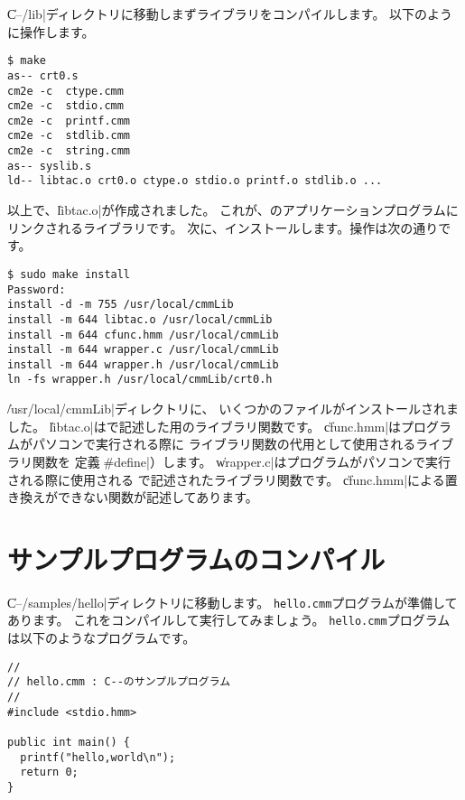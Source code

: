 \|C--/lib|ディレクトリに移動しまずライブラリをコンパイルします。
以下のように操作します。

\begin{mylist}
\begin{verbatim}
$ make
as-- crt0.s
cm2e -c  ctype.cmm
cm2e -c  stdio.cmm
cm2e -c  printf.cmm
cm2e -c  stdlib.cmm
cm2e -c  string.cmm
as-- syslib.s
ld-- libtac.o crt0.o ctype.o stdio.o printf.o stdlib.o ...
\end{verbatim}
\end{mylist}

以上で、\|libtac.o|が作成されました。
これが、{\tacos}のアプリケーションプログラムにリンクされるライブラリです。
次に、インストールします。操作は次の通りです。

\begin{mylist}
\begin{verbatim}
$ sudo make install
Password:
install -d -m 755 /usr/local/cmmLib
install -m 644 libtac.o /usr/local/cmmLib
install -m 644 cfunc.hmm /usr/local/cmmLib
install -m 644 wrapper.c /usr/local/cmmLib
install -m 644 wrapper.h /usr/local/cmmLib
ln -fs wrapper.h /usr/local/cmmLib/crt0.h
\end{verbatim}
\end{mylist}

\|/usr/local/cmmLib|ディレクトリに、
いくつかのファイルがインストールされました。
\|libtac.o|は{\cmml}で記述した{\tacos}用のライブラリ関数です。
\|cfunc.hmm|は{\cmm}プログラムがパソコンで実行される際に
{\cmml}ライブラリ関数の代用として使用される{\cl}ライブラリ関数を
定義（\|#define|）します。
\|wrapper.c|は{\cmm}プログラムがパソコンで実行される際に使用される
{\cl}で記述された{\cmm}ライブラリ関数です。
\|cfunc.hmm|による置き換えができない関数が記述してあります。

\section{サンプルプログラムのコンパイル}

\|C--/samples/hello|ディレクトリに移動します。
{\tt hello.cmm}プログラムが準備してあります。
これをコンパイルして実行してみましょう。
{\tt hello.cmm}プログラムは以下のような{\cmml}プログラムです。

\begin{mylist}
\begin{verbatim}
//
// hello.cmm : C--のサンプルプログラム
//
#include <stdio.hmm>

public int main() {
  printf("hello,world\n");
  return 0;
}
\end{verbatim}
\end{mylist}

